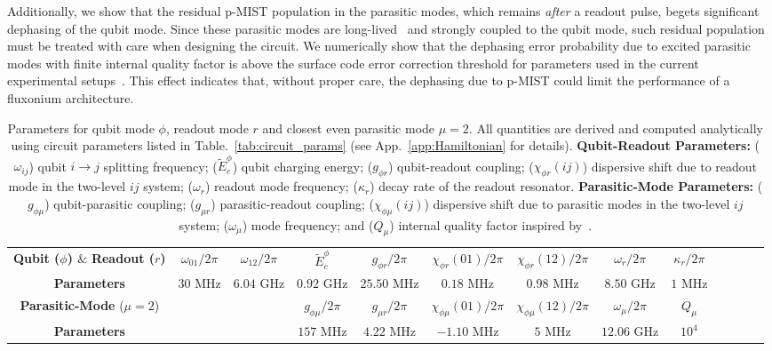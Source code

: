 \documentclass[%
reprint,
superscriptaddress,
 amsmath,amssymb,
 aps,
 prx,
longbibliography,
floatfix,
]{revtex4-2}
\begin{document}
Additionally, we show that the residual p-MIST population in the parasitic modes, which remains \textit{after} a readout pulse, begets significant dephasing of the qubit mode. Since these parasitic modes are long-lived~\cite{masluk_microwave_2012} and strongly coupled to the qubit mode, such residual population must be treated with care when designing the circuit. We numerically show that the dephasing error probability due to excited parasitic modes with finite internal quality factor is above the surface code error correction threshold for parameters used in the current experimental setups~\cite{masluk_microwave_2012,zhang_universal_2021,manucharyan2009fluxonium}. This effect indicates that, without proper care, the dephasing due to p-MIST could limit the performance of a fluxonium architecture.

\begin{table}[tb]
    \centering
\begin{tabular}{|c|c|c|c|c|c|c|c|c|c|c|c|c|}
    \hline
\shortstack{\\\textbf{Qubit ($\phi$) $\&$ }\\ \textbf{Readout ($r$)}} &$\omega_{01}/2\pi$&$\omega_{12}/2\pi$ &$\tilde{E}^\phi_c$ &$g_{\phi r}/2\pi$&$\chi_{\phi r}(01)/2\pi$&$\chi_{\phi r}(12)/2\pi$&$\omega_r/2\pi$&$\kappa_r/2\pi$\\
    \cline{2-9}
\textbf{Parameters}&$30$ MHz& $6.04$ GHz & $0.92$ GHz& $25.50$ MHz& $0.18$ MHz&$0.98$ MHz&$8.50$ GHz&$1$ MHz\\    
\hline
     \shortstack{\\\textbf{Parasitic-Mode}\\ ($\mu=2$)} & && $g_{\phi\mu}/2\pi$&$g_{\mu r}/2\pi$&$\chi_{\phi\mu}(01)/2\pi$&$\chi_{\phi\mu}(12)/2\pi$&$\omega_\mu/2\pi$&$Q_\mu$\\
    \cline{4-9}
\textbf{Parameters}&&&$157$ MHz& $4.22$ MHz& $-1.10$ MHz& $5$ MHz& $12.06$ GHz&$10^{4}$\\    
\hline
\end{tabular}
\caption{Parameters for qubit mode $\phi$, readout mode $r$ and closest even parasitic mode $\mu=2$.  All quantities are derived and computed analytically using circuit parameters listed in Table.~\ref{tab:circuit_params} (see App.~\ref{app:Hamiltonian} for details). \textbf{Qubit-Readout Parameters:} ($\omega_{ij}$) qubit $i\rightarrow j$ splitting frequency; ($\tilde{E}^\phi_c$) qubit charging energy; ($g_{\phi r}$) qubit-readout coupling; ($\chi_{\phi r}(ij)$) dispersive shift due to readout mode in the two-level $ij$ system; ($\omega_r$) readout mode frequency; ($\kappa_r$) decay rate of the readout resonator. \textbf{Parasitic-Mode Parameters:} ($g_{\phi \mu}$) qubit-parasitic coupling; ($g_{\mu r}$) parasitic-readout coupling; ($\chi_{\phi \mu}(ij)$) dispersive shift due to parasitic modes in the two-level $ij$ system; ($\omega_\mu$) mode frequency; and ($Q_\mu$) internal quality factor inspired by~\cite{masluk_microwave_2012}.}   \label{tab:readout_params}
\end{table}
\end{document}
